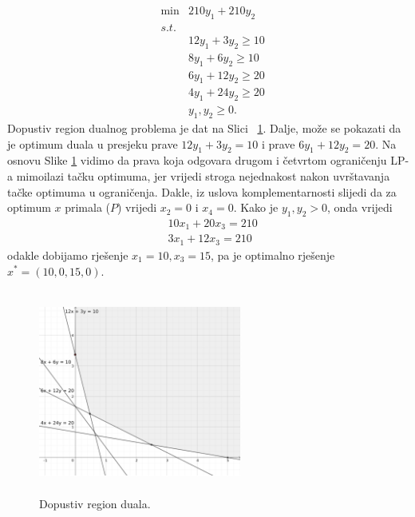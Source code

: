 \documentclass[b5paper, utf8, 11pt, colorlinks]{book}
\theoremstyle{definition}
\begin{document}
$$\begin{array}{lll}
	&\min                    &  210 y_1 + 210 y_2      \\
	&{s.t. }     &  \\
	&            &  12 y_1  + 3   y_2 \geq 10 \\
	&                        &  8  y_1 + 6    y_2 \geq 10 \\
	&                        &  6 y_1 + 12 y_2  \geq 20 \\
	&                        &  4 y_1 + 24 y_2  \geq 20 \\
	&                        &  y_1, y_2 \geq 0.
\end{array}$$
Dopustiv region dualnog problema je dat na Slici~ \ref{fig:fig6-dual-region}. %
Dalje, može se pokazati da je optimum duala u presjeku prave $12 y_1 + 3 y_2 = 10$ i prave $6y_1 + 12 y_2 = 20$. Na osnovu Slike \ref{fig:fig6-dual-region} vidimo da   prava koja odgovara drugom i četvrtom ograničenju LP-a mimoilazi tačku optimuma, jer vrijedi stroga nejednakost nakon uvrštavanja tačke optimuma u ograničenja. Dakle, iz uslova komplementarnosti slijedi da za optimum $x$ primala  ($P$)  vrijedi $x_2 = 0$ i $x_4 = 0$.  Kako je $y_1, y_2 > 0$, onda vrijedi 
\begin{align}
	&10 x_1 + 20 x_3 = 210 \nonumber \\
	& 3x_1 + 12 x_3  = 210 \nonumber
\end{align}
odakle dobijamo rješenje $x_1 = 10, x_3 = 15$, pa je optimalno rješenje $x^* = (10, 0, 15, 0)$.

\begin{figure}[H]
	\centering
	\includegraphics[width=190pt, height=190pt]{fig6.eps}
	\caption{Dopustiv region duala.}
	\label{fig:fig6-dual-region}
\end{figure}
\end{document}
